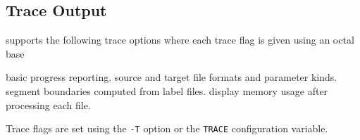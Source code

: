 \subsection{Trace Output}

 supports the following trace options where each
trace flag is given using an octal base
\begin{optlist}

  basic progress reporting. 
  source and target file formats and parameter kinds.
  segment boundaries computed from label files.
  display memory usage after processing each file.
\end{optlist}
Trace flags are set using the \texttt{-T} option or the  \texttt{TRACE} 
configuration variable.


